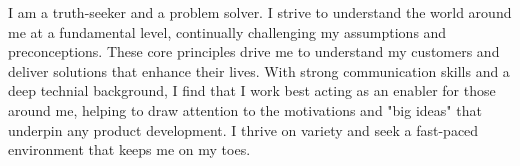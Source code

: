 

\begin{cvparagraph}

  I am a truth-seeker and a problem solver. I strive to understand the world around me at a fundamental level, continually challenging my assumptions and preconceptions. These core principles drive me to understand my customers and deliver solutions that enhance their lives. With strong communication skills and a deep technial background, I find that I work best acting as an enabler for those around me, helping to draw attention to the motivations and "big ideas" that underpin any product development. I thrive on variety and seek a fast-paced environment that keeps me on my toes.
\end{cvparagraph}
